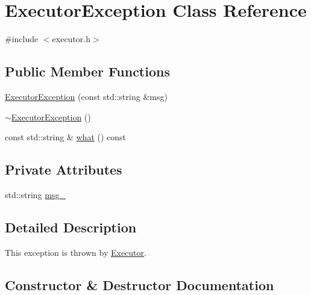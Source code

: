 \hypertarget{classExecutorException}{}\section{Executor\+Exception Class Reference}
\label{classExecutorException}


{\ttfamily \#include $<$executor.\+h$>$}

\subsection*{Public Member Functions}
\begin{DoxyCompactItemize}
\item 
\hyperlink{classExecutorException_adff103d3f2d66a2ac185a6ad82cc184b}{Executor\+Exception} (const std\+::string \&msg)
\item 
\hyperlink{classExecutorException_aa8486a8969ef4458c0d00e887a5cad2a}{$\sim$\+Executor\+Exception} ()
\item 
const std\+::string \& \hyperlink{classExecutorException_ac5233ff149ab4ab2b5b980abbfcd2bd3}{what} () const 
\end{DoxyCompactItemize}
\subsection*{Private Attributes}
\begin{DoxyCompactItemize}
\item 
std\+::string \hyperlink{classExecutorException_a7de585a1cc08621e9303275a2b944cf5}{msg\+\_\+}
\end{DoxyCompactItemize}


\subsection{Detailed Description}
This exception is thrown by \hyperlink{classExecutor}{Executor}. 

\subsection{Constructor \& Destructor Documentation}
\hypertarget{classExecutorException_adff103d3f2d66a2ac185a6ad82cc184b}{}
